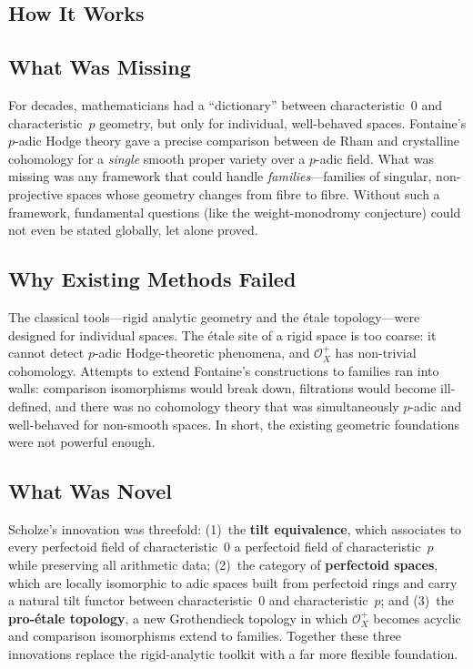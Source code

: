 \subsection{How It Works}

\subsection{What Was Missing}
For decades, mathematicians had a ``dictionary'' between characteristic~$0$ and characteristic~$p$ geometry, but only for individual, well-behaved spaces. Fontaine's $p$-adic Hodge theory gave a precise comparison between de Rham and crystalline cohomology for a \emph{single} smooth proper variety over a $p$-adic field. What was missing was any framework that could handle \emph{families}---families of singular, non-projective spaces whose geometry changes from fibre to fibre. Without such a framework, fundamental questions (like the weight-monodromy conjecture) could not even be stated globally, let alone proved.

\subsection{Why Existing Methods Failed}
The classical tools---rigid analytic geometry and the étale topology---were designed for individual spaces. The étale site of a rigid space is too coarse: it cannot detect $p$-adic Hodge-theoretic phenomena, and $\mathcal{O}_X^+$ has non-trivial cohomology. Attempts to extend Fontaine's constructions to families ran into walls: comparison isomorphisms would break down, filtrations would become ill-defined, and there was no cohomology theory that was simultaneously $p$-adic and well-behaved for non-smooth spaces. In short, the existing geometric foundations were not powerful enough.

\subsection{What Was Novel}
Scholze's innovation was threefold: (1)~the \textbf{tilt equivalence}, which associates to every perfectoid field of characteristic~$0$ a perfectoid field of characteristic~$p$ while preserving all arithmetic data; (2)~the category of \textbf{perfectoid spaces}, which are locally isomorphic to adic spaces built from perfectoid rings and carry a natural tilt functor between characteristic~$0$ and characteristic~$p$; and (3)~the \textbf{pro-étale topology}, a new Grothendieck topology in which $\mathcal{O}_X^+$ becomes acyclic and comparison isomorphisms extend to families. Together these three innovations replace the rigid-analytic toolkit with a far more flexible foundation.

